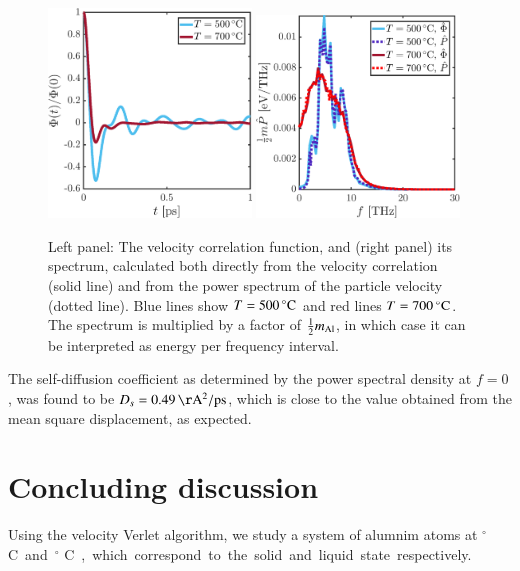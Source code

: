 \begin{figure}[!ht]
\begin{center}
  \includegraphics[width=0.48\textwidth]{../figures/Phi-t} 
    \includegraphics[width=0.48\textwidth]{../figures/P-freq} 
  \caption{Left panel: The velocity correlation function, and (right panel) its spectrum, calculated both directly from the velocity correlation (solid line) and from the power spectrum of the particle velocity (dotted line). Blue lines show $T=\unit[500]{^\circ C}$ and red lines $T=\unit[700]{^\circ C}$. The spectrum is multiplied by a factor of $\tfrac{1}{2} m_{\rm Al}$, in which case it can be interpreted as energy per frequency interval. }
  \label{fig:spectrum}
\end{center}
\end{figure}

The self-diffusion coefficient as determined by the power spectral density at $f=0$, was found to be  $D_s = \unit[0.49]{\AA^2/ps}$, which is close to the value obtained from the mean square displacement, as expected.  


\section*{Concluding discussion}
Using the velocity Verlet algorithm, we study a system of alumnim atoms  at \unit[500]{$^\circ$ C} and \unit[700]{$^\circ$ C}, which correspond to the solid and liquid state respectively.

